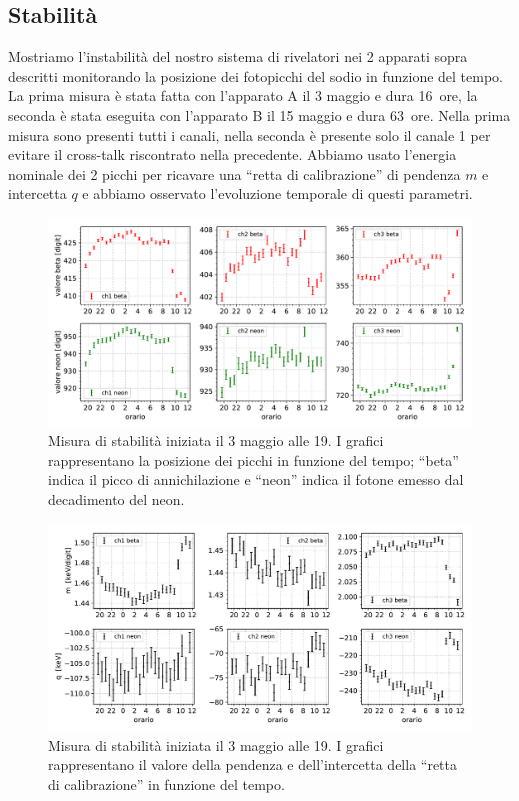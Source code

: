 \subsection{Stabilità}

Mostriamo l'instabilità del nostro sistema di rivelatori nei 2 apparati sopra descritti monitorando la posizione dei fotopicchi del sodio in funzione del tempo.
La prima misura è stata fatta con l'apparato A il 3 maggio e dura \SI{16}{ore}, la seconda  è stata eseguita con l'apparato B il 15 maggio e dura \SI{63}{ore}.
Nella prima misura sono presenti tutti i canali, nella seconda è presente solo il canale 1 per evitare il cross-talk riscontrato nella precedente.
Abbiamo usato l'energia nominale dei 2 picchi per ricavare una ``retta di calibrazione'' di pendenza $m$ e intercetta $q$ e abbiamo osservato l'evoluzione temporale di questi parametri.

\begin{figure}[h]
\centering
\includegraphics[width=\textwidth]{immagini/0503_picchi}
\caption{Misura di stabilità iniziata il 3 maggio alle 19. I grafici rappresentano la posizione dei picchi in funzione del tempo; ``beta'' indica il picco di annichilazione e ``neon'' indica il fotone emesso dal decadimento del neon.}
\label{picchi1}
\end{figure}

\begin{figure}[h]
\centering
\includegraphics[width=\textwidth]{immagini/0503_rette}
\caption{Misura di stabilità iniziata il 3 maggio alle 19. I grafici rappresentano il valore della pendenza e dell'intercetta della ``retta di calibrazione'' in funzione del tempo.}
\label{rette1}
\end{figure}

